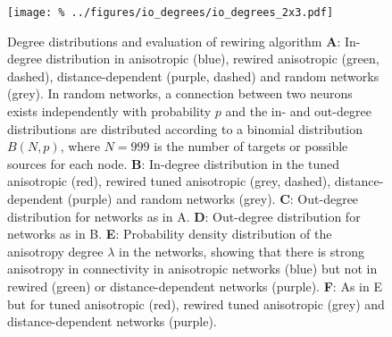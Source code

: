 

\begin{figure}[h]
  \texttt{[image: \%
    ../figures/io\_degrees/io\_degrees\_2x3.pdf]} %
  \caption{Degree distributions and evaluation of rewiring algorithm %
    \textbf{A}: In-degree distribution in anisotropic (blue), rewired
    anisotropic (green, dashed), distance-dependent (purple, dashed)
    and random networks (grey). In random networks, a connection between
    two neurons exists independently with probability $p$ and the in- and
    out-degree distributions are distributed according to a binomial
    distribution $B(N,p)$, where $N=999$ is the number of targets or
    possible sources for each node. %
    \textbf{B}: In-degree distribution in the tuned anisotropic (red),
    rewired tuned anisotropic (grey, dashed), distance-dependent
    (purple) and random networks (grey). %
    \textbf{C}: Out-degree distribution for networks as in A. %
    \textbf{D}: Out-degree distribution for networks as in B. %
    \textbf{E}: Probability density distribution of the anisotropy
    degree $\lambda$ in the networks, showing that there is strong
    anisotropy in connectivity in anisotropic networks (blue) but
    not in rewired (green) or distance-dependent networks (purple). %
    \textbf{F}: As in E but for tuned anisotropic (red), rewired tuned
    anisotropic (grey) and distance-dependent networks (purple).}
\label{fig:io_deg}
\end{figure}


